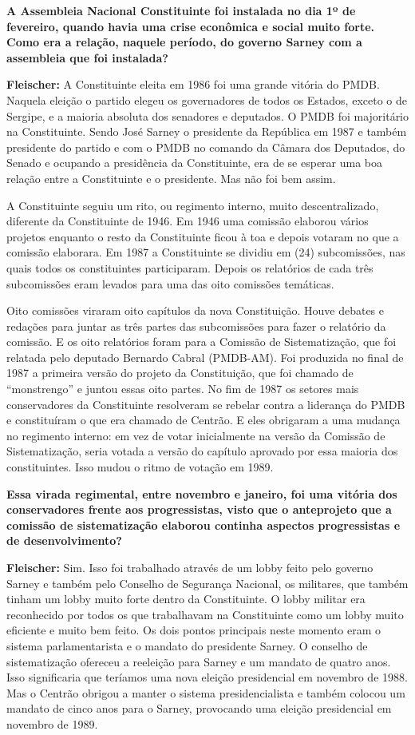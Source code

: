 \textbf{A Assembleia Nacional Constituinte foi instalada no dia 1º de
fevereiro, quando havia uma crise econômica e social muito forte. Como
era a relação, naquele período, do governo Sarney com a assembleia que
foi instalada?}

\textbf{Fleischer:} A Constituinte eleita em 1986 foi uma grande vitória
do PMDB. Naquela eleição o partido elegeu os governadores de todos os
Estados, exceto o de Sergipe, e a maioria absoluta dos senadores e
deputados. O PMDB foi majoritário na Constituinte. Sendo José Sarney o
presidente da República em 1987 e também presidente do partido e com o
PMDB no comando da Câmara dos Deputados, do Senado e ocupando a
presidência da Constituinte, era de se esperar uma boa relação entre a
Constituinte e o presidente. Mas não foi bem assim.

A Constituinte seguiu um rito, ou regimento interno, muito
descentralizado, diferente da Constituinte de 1946. Em 1946 uma comissão
elaborou vários projetos enquanto o resto da Constituinte ficou à toa e
depois votaram no que a comissão elaborara. Em 1987 a Constituinte se
dividiu em (24) subcomissões, nas quais todos os constituintes
participaram. Depois os relatórios de cada três subcomissões eram
levados para uma das oito comissões temáticas.

Oito comissões viraram oito capítulos da nova Constituição. Houve
debates e redações para juntar as três partes das subcomissões para
fazer o relatório da comissão. E os oito relatórios foram para a
Comissão de Sistematização, que foi relatada pelo deputado Bernardo
Cabral (PMDB-AM). Foi produzida no final de 1987 a primeira versão do
projeto da Constituição, que foi chamado de ``monstrengo'' e juntou
essas oito partes. No fim de 1987 os setores mais conservadores da
Constituinte resolveram se rebelar contra a liderança do PMDB e
constituíram o que era chamado de Centrão. E eles obrigaram a uma
mudança no regimento interno: em vez de votar inicialmente na versão da
Comissão de Sistematização, seria votada a versão do capítulo aprovado
por essa maioria dos constituintes. Isso mudou o ritmo de votação em
1989.

\textbf{Essa virada regimental, entre novembro e janeiro, foi uma
vitória dos conservadores frente aos progressistas, visto que o
anteprojeto que a comissão de sistematização elaborou continha aspectos
progressistas e de desenvolvimento?}

\textbf{Fleischer:} Sim. Isso foi trabalhado através de um lobby feito
pelo governo Sarney e também pelo Conselho de Segurança Nacional, os
militares, que também tinham um lobby muito forte dentro da
Constituinte. O lobby militar era reconhecido por todos os que
trabalhavam na Constituinte como um lobby muito eficiente e muito bem
feito. Os dois pontos principais neste momento eram o sistema
parlamentarista e o mandato do presidente Sarney. O conselho de
sistematização ofereceu a reeleição para Sarney e um mandato de quatro
anos. Isso significaria que teríamos uma nova eleição presidencial em
novembro de 1988. Mas o Centrão obrigou a manter o sistema
presidencialista e também colocou um mandato de cinco anos para o
Sarney, provocando uma eleição presidencial em novembro de 1989.

